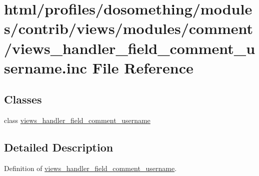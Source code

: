 \hypertarget{views__handler__field__comment__username_8inc}{
\section{html/profiles/dosomething/modules/contrib/views/modules/comment/views\_\-handler\_\-field\_\-comment\_\-username.inc File Reference}
\label{views__handler__field__comment__username_8inc}
}
\subsection*{Classes}
\begin{DoxyCompactItemize}
\item 
class \hyperlink{classviews__handler__field__comment__username}{views\_\-handler\_\-field\_\-comment\_\-username}
\end{DoxyCompactItemize}


\subsection{Detailed Description}
Definition of \hyperlink{classviews__handler__field__comment__username}{views\_\-handler\_\-field\_\-comment\_\-username}. 